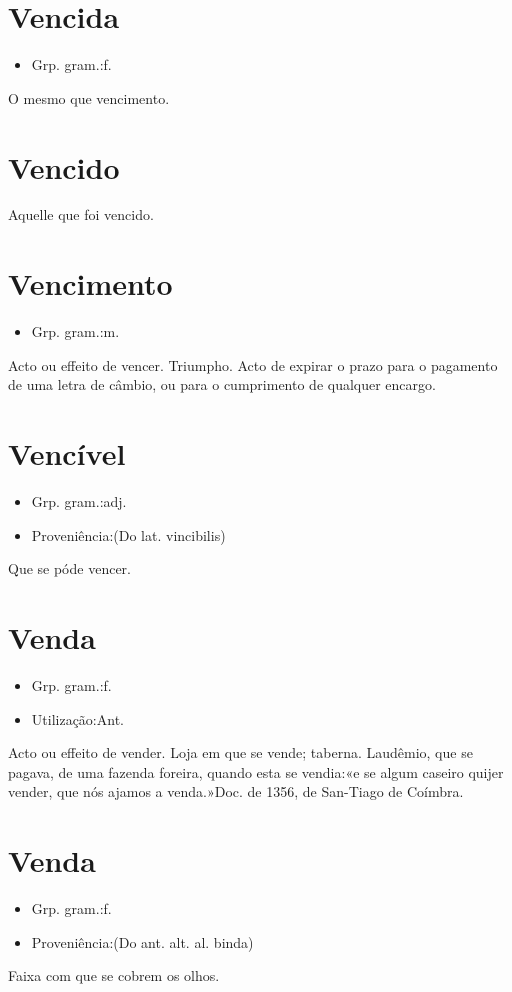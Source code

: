 \documentclass{article}
\begin{document}
\section{Vencida}
\begin{itemize}
\item {Grp. gram.:f.}
\end{itemize}
O mesmo que \textunderscore vencimento\textunderscore .
\section{Vencido}
Aquelle que foi vencido.
\section{Vencimento}
\begin{itemize}
\item {Grp. gram.:m.}
\end{itemize}
Acto ou effeito de vencer.
Triumpho.
Acto de expirar o prazo para o pagamento de uma letra de câmbio, ou para o cumprimento de qualquer encargo.
\section{Vencível}
\begin{itemize}
\item {Grp. gram.:adj.}
\end{itemize}
\begin{itemize}
\item {Proveniência:(Do lat. \textunderscore vincibilis\textunderscore )}
\end{itemize}
Que se póde vencer.
\section{Venda}
\begin{itemize}
\item {Grp. gram.:f.}
\end{itemize}
\begin{itemize}
\item {Utilização:Ant.}
\end{itemize}
Acto ou effeito de vender.
Loja em que se vende; taberna.
Laudêmio, que se pagava, de uma fazenda foreira, quando esta se vendia:«\textunderscore e se algum caseiro quijer vender, que nós ajamos a venda.\textunderscore »\textunderscore Doc. de 1356\textunderscore , de San-Tiago de Coímbra.
\section{Venda}
\begin{itemize}
\item {Grp. gram.:f.}
\end{itemize}
\begin{itemize}
\item {Proveniência:(Do ant. alt. al. \textunderscore binda\textunderscore )}
\end{itemize}
Faixa com que se cobrem os olhos.
\end{document}
